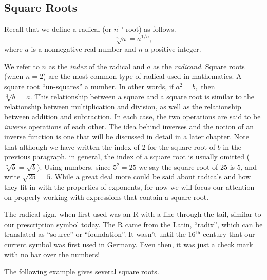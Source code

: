 \subsection{Square Roots}\par


{}\pp

Recall that we define a radical (or $n^{\text{th}}$ root) as follows.
$$\sqrt[n]{a}=a^{1/n},$$
where $a$ is a nonnegative real number and $n$ a positive integer.\pp

We refer to $n$ as the \textit{index} of the radical and $a$ as the \textit{radicand}.  Square roots (when $n=2$) are the most common type of radical used in mathematics. A square root ``un-squares'' a number. In other words, if $a^2=b,$ then\\ $\sqrt[2]{b}=a$.  This relationship between a square and a square root is similar to the relationship between multiplication and division, as well as the relationship between addition and subtraction.  In each case, the two operations are said to be \textit{inverse} operations of each other.  The idea behind inverses and the notion of an inverse function is one that will be discussed in detail in a later chapter.\pp
Note that although we have written the index of 2 for the square root of $b$ in the previous paragraph, in general, the index of a square root is usually omitted ($\sqrt[2]{b}=\sqrt{b}$).  Using numbers, since $5^2 = 25$ we say the square root of 25 is 5, and write $\sqrt{25}=5$.\pp
While a great deal more could be said about radicals and how they fit in with the properties of exponents, for now we will focus our attention on properly working with expressions that contain a square root.\pp

{} The radical sign, when first used was an R with
a line through the tail, similar to our prescription symbol today. The R came
from the Latin, ``radix'', which can be translated as ``source'' or
``foundation''. It wasn't until the 16$^{\text{th}}$ century that our current symbol was first
used in Germany.  Even then, it was just a check mark with no bar over the
numbers!\pp

\newpage

The following example gives several square roots.

